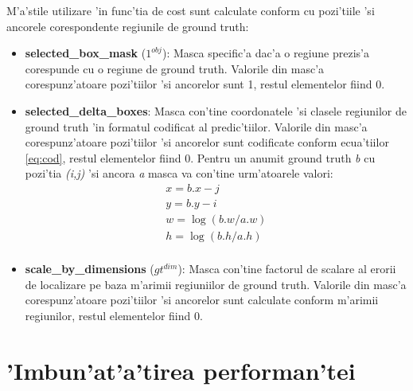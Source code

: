 \documentclass[12pt,a4paper,twoside]{report}
\begin{document}
\leavevmode \newline
M'a'stile utilizare 'in func'tia de cost sunt calculate conform cu pozi'tiile 'si ancorele corespondente regiunile de ground truth:
\begin{itemize}
\item \textbf{selected\_box\_mask} ($1^{obj}$):  Masca specific'a dac'a o regiune prezis'a corespunde cu o regiune de ground truth. Valorile din masc'a corespunz'atoare pozi'tiilor 'si ancorelor sunt 1, restul elementelor fiind 0. 
 
\item \textbf{selected\_delta\_boxes}: Masca con'tine coordonatele 'si clasele regiunilor de ground truth 'in formatul codificat al predic'tiilor.  Valorile din masc'a corespunz'atoare pozi'tiilor 'si ancorelor sunt codificate conform ecua'tiilor \ref{eq:cod}, restul elementelor fiind 0. Pentru un anumit ground truth \textit{b} cu pozi'tia \textit{(i,j)} 'si ancora \textit{a} masca va con'tine urm'atoarele valori:
\begin{equation}
\begin{split}
x = b.x - j \\
y = b.y - i \\
w = \log(b.w / a.w) \\
h = \log(b.h / a.h) \\
\end{split}
\label{eq:cod}
\end{equation}

\item \textbf{scale\_by\_dimensions} ($gt^{dim}$): Masca con'tine factorul de scalare al erorii de localizare pe baza m'arimii regiuniilor de ground truth. Valorile din masc'a corespunz'atoare pozi'tiilor 'si ancorelor sunt calculate conform m'arimii regiunilor, restul elementelor fiind 0.
\end{itemize}

\section{'Imbun'at'a'tirea performan'tei}
\end{document}
